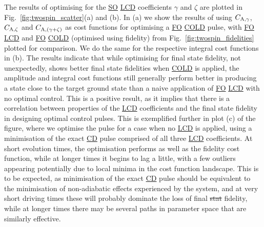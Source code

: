 \documentclass[a4paper,oneside,11pt]{book}
\newcommand{\acrref}[1]{\hyperref[acr:#1]{#1}}
\providecommand{\DIFaddtex}[1]{{\protect\color{blue}\uwave{#1}}} %
\providecommand{\DIFdeltex}[1]{{\protect\color{red}\sout{#1}}}                      %
\providecommand{\DIFaddbegin}{} %
\providecommand{\DIFaddend}{} %
\providecommand{\DIFdelbegin}{} %
\providecommand{\DIFdelend}{} %
\providecommand{\DIFadd}[1]{\texorpdfstring{\DIFaddtex{#1}}{#1}} %
\providecommand{\DIFdel}[1]{\texorpdfstring{\DIFdeltex{#1}}{}} %
\newcommand{\DIFscaledelfig}{0.5}
\newlength{\DIFdelgraphicswidth} %
\newlength{\DIFdelgraphicsheight} %
\newcommand{\DIFaddincludegraphics}[2][]{{\color{blue}\fbox{\DIFOincludegraphics[#1]{#2}}}} %
\newcommand{\DIFdelincludegraphics}[2][]{%
\sbox{\DIFdelgraphicsbox}{\DIFOincludegraphics[#1]{#2}}%
\settoboxwidth{\DIFdelgraphicswidth}{\DIFdelgraphicsbox} %
\settoboxtotalheight{\DIFdelgraphicsheight}{\DIFdelgraphicsbox} %
\scalebox{\DIFscaledelfig}{%
\parbox[b]{\DIFdelgraphicswidth}{\usebox{\DIFdelgraphicsbox}\\[-\baselineskip] \rule{\DIFdelgraphicswidth}{0em}}\llap{\resizebox{\DIFdelgraphicswidth}{\DIFdelgraphicsheight}{%
\setlength{\unitlength}{\DIFdelgraphicswidth}%
\begin{picture}(1,1)%
\thicklines\linethickness{2pt} %
{\color[rgb]{1,0,0}\put(0,0){\framebox(1,1){}}}%
{\color[rgb]{1,0,0}\put(0,0){\line( 1,1){1}}}%
{\color[rgb]{1,0,0}\put(0,1){\line(1,-1){1}}}%
\end{picture}%
}\hspace*{3pt}}} %
} %
\DeclareRobustCommand{\DIFaddbegin}{\DIFOaddbegin \let\includegraphics\DIFaddincludegraphics} %
\DeclareRobustCommand{\DIFaddend}{\DIFOaddend \let\includegraphics\DIFOincludegraphics} %
\DeclareRobustCommand{\DIFdelbegin}{\DIFOdelbegin \let\includegraphics\DIFdelincludegraphics} %
\DeclareRobustCommand{\DIFdelend}{\DIFOaddend \let\includegraphics\DIFOincludegraphics} %
\begin{document}
The results of optimising for the \acrref{SO} \acrref{LCD} coefficients $\gamma$ and $\zeta$ are plotted in Fig.~\ref{fig:twospin_scatter}(a) and (b). In (a) we show the results of using $C_{\rm A, \gamma}$, $C_{\rm A, \zeta}$ and $C_{\rm A, (\gamma + \zeta)}$ as cost functions for optimising a \acrref{FO} \acrref{COLD} pulse, with \acrref{FO} \acrref{LCD} and \acrref{FO} \acrref{COLD} (optimised using fidelity) from Fig.~\ref{fig:twospin_fidelities} plotted for comparison. We do the same for the respective integral cost functions in (b). The results indicate that while optimising for final state fidelity, not unexpectedly, shows better final state fidelities when \acrref{COLD} is applied, the amplitude and integral cost functions still generally perform better in producing a state close to the target ground state than a naive application of \acrref{FO} \acrref{LCD} with no optimal control. This is a positive result, as it implies that there is a correlation between properties of the \acrref{LCD} coefficients and the final state fidelity in designing optimal control pulses. This is exemplified further in plot (c) of the figure, where we optimise the pulse for a case when no \acrref{LCD} is applied, using a minimisation of the exact \acrref{CD} pulse comprised of all three \acrref{LCD} coefficients. At short evolution times, the optimisation performs as well as the fidelity cost function, while at longer times it begins to lag a little, with a few outliers appearing potentially due to local minima in the cost function landscape. This is to be expected, as minimisation of the exact \acrref{CD} pulse should be equivalent to the minimisation of non-adiabatic effects experienced by the system, and at very short driving times these will probably dominate the loss of final \DIFdelbegin \DIFdel{stat }\DIFdelend \DIFaddbegin \DIFadd{state }\DIFaddend fidelity, while at longer times there may be several paths in parameter space that are similarly effective. 
\end{document}
